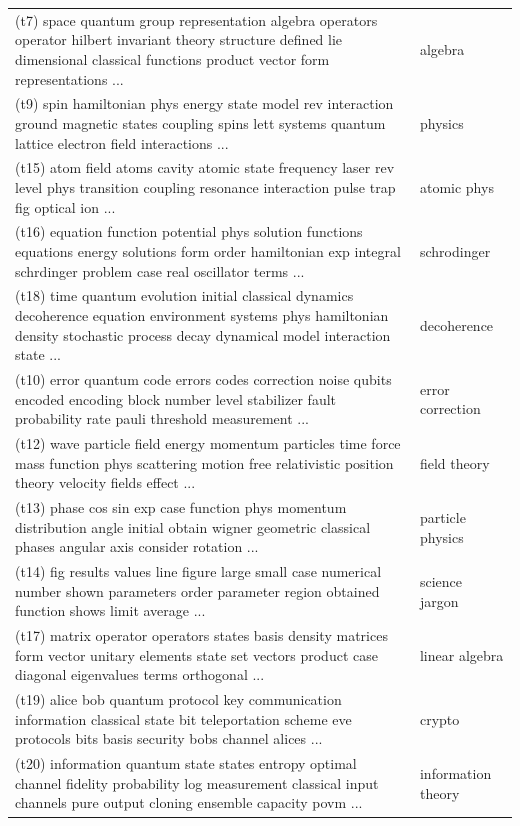 \documentclass[11pt]{article}
\begin{document}
\begin{table}
\begin{footnotesize}
\begin{raggedright}
\begin{tabular}{|p{4.7in} p{1.2in} |}
        (t7) space quantum group representation algebra operators operator hilbert invariant theory
        structure defined lie dimensional classical functions product vector form representations ...
        & algebra \\

        (t9) spin hamiltonian phys energy state model rev interaction ground magnetic states coupling spins
        lett systems quantum lattice electron field interactions ...
        & physics \\
        (t15) atom field atoms cavity atomic state frequency laser rev level phys transition coupling
        resonance interaction pulse trap fig optical ion ...
        & atomic phys \\
        (t16) equation function potential phys solution functions equations energy solutions form order
        hamiltonian exp integral schrdinger problem case real oscillator terms ...
        & schrodinger \\
        (t18) time quantum evolution initial classical dynamics decoherence equation environment systems
        phys hamiltonian density stochastic process decay dynamical model interaction state ...
        & decoherence \\
        (t10) error quantum code errors codes correction noise qubits encoded encoding block number level
        stabilizer fault probability rate pauli threshold measurement ...
        & error correction \\

        (t12) wave particle field energy momentum particles time force mass function phys scattering motion
        free relativistic position theory velocity fields effect ...
        & field theory \\
        (t13) phase cos sin exp case function phys momentum distribution angle initial obtain wigner
        geometric classical phases angular axis consider rotation ...
        & particle physics \\

        (t14) fig results values line figure large small case numerical number shown parameters order
        parameter region obtained function shows limit average ...
        & science jargon \\


        (t17) matrix operator operators states basis density matrices form vector unitary elements state set
        vectors product case diagonal eigenvalues terms orthogonal ...
        & linear algebra \\
        (t19) alice bob quantum protocol key communication information classical state bit teleportation
        scheme eve protocols bits basis security bobs channel alices ...
        & crypto \\
        (t20) information quantum state states entropy optimal channel fidelity probability log measurement
        classical input channels pure output cloning ensemble capacity povm ...
        & information theory \\


\end{tabular}
\end{raggedright}
\end{footnotesize}
\end{table}
\end{document}
